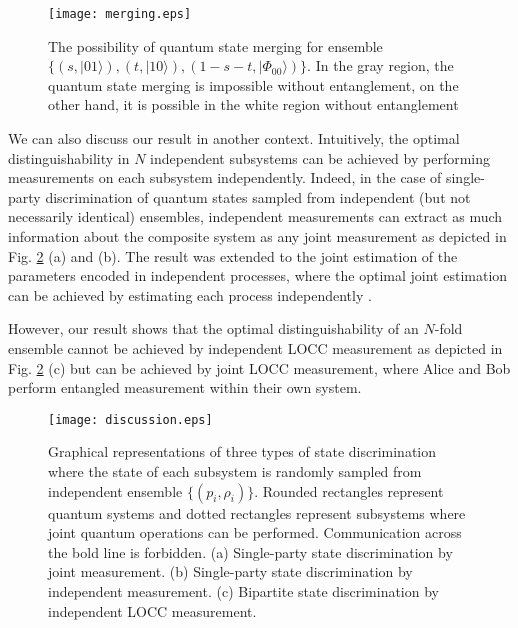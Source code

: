 \documentclass[aps,prx,twocolumn,showpacs,amsmath,notitlepage,amssymb,superscriptaddress]{revtex4-1}
\newcommand{\ket}[1]{| {#1} \rangle}
\begin{document}
\begin{figure}
 \centering
  \texttt{[image: merging.eps]}
  \caption{The possibility of quantum state merging for ensemble $\{(s,\ket{01}),(t,\ket{10}),(1-s-t,\ket{\Phi_{00}})\}$. In the gray region, the quantum state merging is impossible without entanglement, on the other hand, it is possible in the white region without entanglement}
\label{fig:merging}
\end{figure} 


We can also discuss our result in another context. Intuitively, the optimal distinguishability in $N$ independent subsystems can be achieved by performing measurements on each subsystem independently. Indeed, in the case of single-party discrimination of quantum states sampled from independent (but not necessarily identical) ensembles, independent measurements can extract as much information about the composite system as any joint measurement \cite{productrule1} as depicted in Fig. \ref{fig:discussion} (a) and (b). The result was extended to the joint estimation of the parameters encoded in independent processes, where the optimal joint estimation can be achieved by estimating each process independently \cite{productrule2}.

However, our result shows that the optimal distinguishability of an $N$-fold ensemble cannot be achieved by independent LOCC measurement as depicted in Fig. \ref{fig:discussion} (c) but can be achieved by joint LOCC measurement, where Alice and Bob perform entangled measurement within their own system. 


\begin{figure}
 \centering
  \texttt{[image: discussion.eps]}
  \caption{Graphical representations of three types of state discrimination where the state of each subsystem is randomly sampled from independent ensemble $\{(p_i,\rho_i)\}$. Rounded rectangles represent quantum systems and dotted rectangles represent subsystems where joint quantum operations can be performed. Communication across the bold line is forbidden. (a) Single-party state discrimination by joint measurement. (b) Single-party state discrimination by independent measurement. (c) Bipartite state discrimination by independent LOCC measurement.}
\label{fig:discussion}
\end{figure} 
\end{document}
